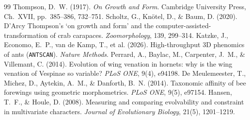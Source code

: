 \documentclass[10pt,twocolumn]{article}
\begin{document}
\begin{thebibliography}{99}
\small
{} Thompson, D.~W. (1917). \emph{On Growth and Form}. Cambridge University Press, Ch.~XVII, pp.~385--386, 732--751.
 Scholtz, G., Kn\"otel, D., \& Baum, D. (2020). D'Arcy Thompson's `on growth and form' and the computer-assisted-transformation of crab carapaces. \emph{Zoomorphology}, 139, 299--314.
 Katzke, J., Economo, E.~P., van de Kamp, T., et al. (2026). High-throughput 3D phenomics of ants (\texttt{ANTSCAN}). \emph{Nature Methods}.
 Perrard, A., Baylac, M., Carpenter, J.~M., \& Villemant, C. (2014). Evolution of wing venation in hornets: why is the wing venation of Vespinae so variable? \emph{PLoS ONE}, 9(4), e94198.
 De Meulemeester, T., Michez, D., Aytekin, A.~M., \& Danforth, B.~N. (2014). Taxonomic affinity of bee forewings using geometric morphometrics. \emph{PLoS ONE}, 9(5), e97154.
 Hansen, T.~F., \& Houle, D. (2008). Measuring and comparing evolvability and constraint in multivariate characters. \emph{Journal of Evolutionary Biology}, 21(5), 1201--1219.
\end{thebibliography}
\end{document}
